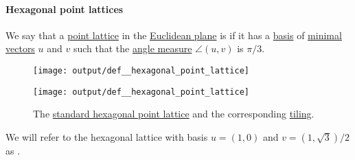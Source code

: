 \paragraph{Hexagonal point lattices}

\begin{definition}\label{def:hexagonal_point_lattice}\mimprovised
  We say that a \hyperref[def:point_lattice]{point lattice} in the \hyperref[def:euclidean_plane]{Euclidean plane} is  if it has a \hyperref[def:point_lattice_basis]{basis} of \hyperref[def:minimal_lattice_vector]{minimal vectors} \( u \) and \( v \) such that the \hyperref[def:angle/measure]{angle measure} \( \angle(u, v) \) is \( \pi / 3 \).

  \begin{figure}[!ht]
    \begin{subcaptionblock}{0.5\textwidth}
      \centering
      \texttt{[image: output/def\_\_hexagonal\_point\_lattice]}
    \end{subcaptionblock}
    \begin{subcaptionblock}{0.5\textwidth}
      \centering
      \texttt{[image: output/def\_\_hexagonal\_point\_lattice]}
    \end{subcaptionblock}
    \caption{The \hyperref[def:hexagonal_point_lattice]{standard hexagonal point lattice} and the corresponding \hyperref[def:hexagonal_tiling]{tiling}.}\label{fig:def:hexagonal_point_lattice}
  \end{figure}

  We will refer to the hexagonal lattice with basis \( u = (1, 0) \) and \( v = (1, \sqrt 3) / 2 \) as .
\end{definition}
